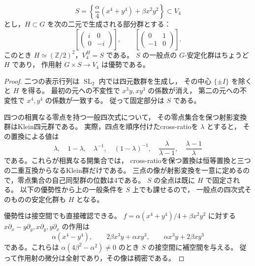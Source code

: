 \begin{lemma}[二係数平面の安定化群と軌道]
\label{lem:binary-quartic-fixed-plane}
\[
 S=\left\{\frac{\alpha}{4}(x^4+y^4)+\beta x^2y^2\right\}
 \subset V_4
\]
とし，$H\subset G$ を次の二元で生成される部分群とする：
\[
 \left[\begin{pmatrix}i&0\\0&-i\end{pmatrix}\right],
 \qquad
 \left[\begin{pmatrix}0&1\\-1&0\end{pmatrix}\right].
\]
このとき $H\simeq(\mathbb Z/2)^2$，$V_4^H=S$ である。
$S$ の一般点の $G$-安定化群はちょうど $H$ であり，
作用射 $G\times S\to V_4$ は優勢である。
\end{lemma}
\begin{proof}
二つの表示行列は $\operatorname{SL}_2$ 内では四元数群を生成し，
その中心 $\{\pm I\}$ を除くと $H$ を得る。
最初の元への不変性で $x^3y,xy^3$ の係数が消え，
第二の元への不変性で $x^4,y^4$ の係数が一致する。
従って固定部分は $S$ である。

四つの相異なる零点を持つ一般四次式について，
その零点集合を保つ射影変換群はKlein四元群である。
実際，四点を順序付けたcross-ratioを $\lambda$ とすると，
その置換による値は
\[
 \lambda,\quad1-\lambda,\quad\lambda^{-1},\quad
 (1-\lambda)^{-1},\quad
 \frac{\lambda}{\lambda-1},\quad\frac{\lambda-1}{\lambda}
\]
である。これらが相異なる開集合では，
cross-ratioを保つ置換は恒等置換と三つの二重互換からなるKlein群だけである。
三点の像が射影変換を一意に定めるので，零点集合の自己同型群の位数は4である。
$S$ の全点は既に $H$ で固定される。
以下の優勢性から上の一般条件を $S$ 上でも課せるので，
一般点の四次式そのものの安定化群も $H$ となる。

優勢性は接空間でも直接確認できる。
$f=\alpha(x^4+y^4)/4+\beta x^2y^2$ に対する
$x\partial_x-y\partial_y,x\partial_y,y\partial_x$ の作用は
\[
 \alpha(x^4-y^4),\qquad
 2\beta x^3y+\alpha xy^3,\qquad
 \alpha x^3y+2\beta xy^3
\]
である。これらは
$\alpha(4\beta^2-\alpha^2)\ne0$ のとき $S$ の接空間に補空間を与える。
従って作用射の微分は全射であり，その像は稠密である。
\end{proof}

